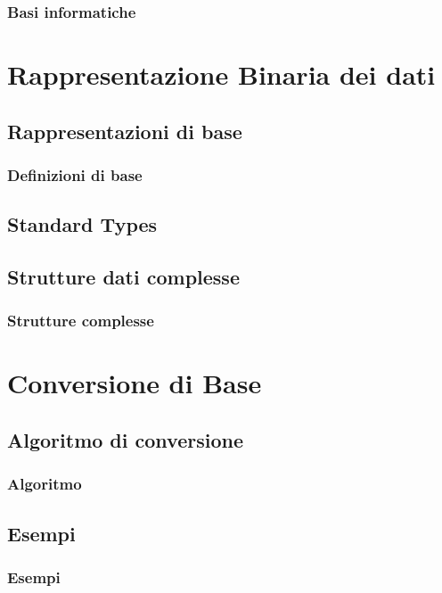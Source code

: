 \documentclass{beamer}
\begin{document}
  \begin{frame}
    \frametitle{Basi informatiche}
  \end{frame}


	\section[BinaryData]{Rappresentazione Binaria dei dati}
	\subsection{Rappresentazioni di base}  
  \begin{frame}
    \frametitle{Definizioni di base}    	
  \end{frame}
  \subsection{Standard Types}
  \begin{frame}   	
  \end{frame}
  \begin{frame}  	
  \end{frame}
  \subsection{Strutture dati complesse}
  \begin{frame}
    \frametitle{Strutture complesse}
  \end{frame} 
  
  \section[Conversion]{Conversione di Base}
  \subsection{Algoritmo di conversione}
  \begin{frame}
    \frametitle{Algoritmo}
  \end{frame}
  \subsection{Esempi}
  \begin{frame}
    \frametitle{Esempi}
  \end{frame}
  
\end{document}
